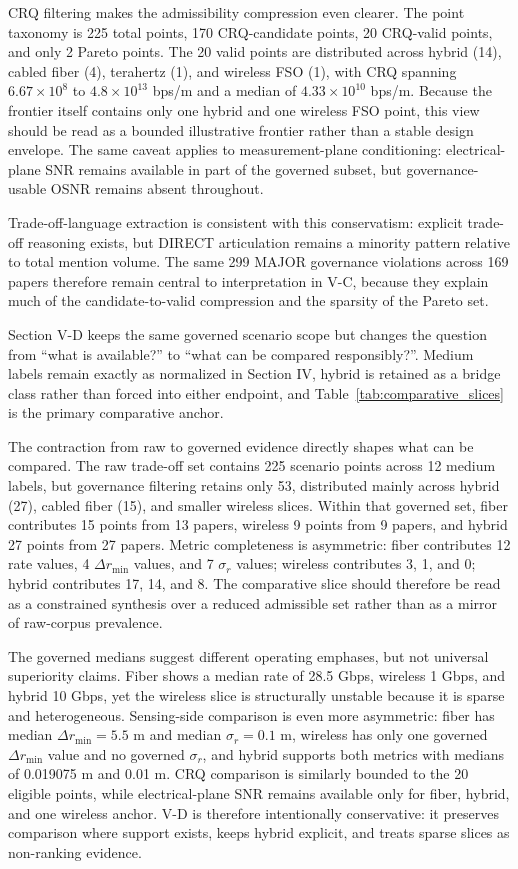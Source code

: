 \documentclass[letterpaper,journal]{IEEEtran}
\begin{document}
CRQ filtering makes the admissibility compression even clearer. The point taxonomy is 225 total points, 170 CRQ-candidate points, 20 CRQ-valid points, and only 2 Pareto points. The 20 valid points are distributed across hybrid (14), cabled fiber (4), terahertz (1), and wireless FSO (1), with CRQ spanning $6.67 \times 10^8$ to $4.8 \times 10^{13}$ bps/m and a median of $4.33 \times 10^{10}$ bps/m. Because the frontier itself contains only one hybrid and one wireless FSO point, this view should be read as a bounded illustrative frontier rather than a stable design envelope. The same caveat applies to measurement-plane conditioning: electrical-plane SNR remains available in part of the governed subset, but governance-usable OSNR remains absent throughout.

Trade-off-language extraction is consistent with this conservatism: explicit trade-off reasoning exists, but DIRECT articulation remains a minority pattern relative to total mention volume. The same 299 MAJOR governance violations across 169 papers therefore remain central to interpretation in V-C, because they explain much of the candidate-to-valid compression and the sparsity of the Pareto set.

Section V-D keeps the same governed scenario scope but changes the question from ``what is available?'' to ``what can be compared responsibly?''. Medium labels remain exactly as normalized in Section IV, hybrid is retained as a bridge class rather than forced into either endpoint, and Table~\ref{tab:comparative_slices} is the primary comparative anchor.

The contraction from raw to governed evidence directly shapes what can be compared. The raw trade-off set contains 225 scenario points across 12 medium labels, but governance filtering retains only 53, distributed mainly across hybrid (27), cabled fiber (15), and smaller wireless slices. Within that governed set, fiber contributes 15 points from 13 papers, wireless 9 points from 9 papers, and hybrid 27 points from 27 papers. Metric completeness is asymmetric: fiber contributes 12 rate values, 4 $\Delta r_{\min}$ values, and 7 $\sigma_r$ values; wireless contributes 3, 1, and 0; hybrid contributes 17, 14, and 8. The comparative slice should therefore be read as a constrained synthesis over a reduced admissible set rather than as a mirror of raw-corpus prevalence.

The governed medians suggest different operating emphases, but not universal superiority claims. Fiber shows a median rate of 28.5 Gbps, wireless 1 Gbps, and hybrid 10 Gbps, yet the wireless slice is structurally unstable because it is sparse and heterogeneous. Sensing-side comparison is even more asymmetric: fiber has median $\Delta r_{\min}=5.5$ m and median $\sigma_r=0.1$ m, wireless has only one governed $\Delta r_{\min}$ value and no governed $\sigma_r$, and hybrid supports both metrics with medians of 0.019075 m and 0.01 m. CRQ comparison is similarly bounded to the 20 eligible points, while electrical-plane SNR remains available only for fiber, hybrid, and one wireless anchor. V-D is therefore intentionally conservative: it preserves comparison where support exists, keeps hybrid explicit, and treats sparse slices as non-ranking evidence.
\end{document}
